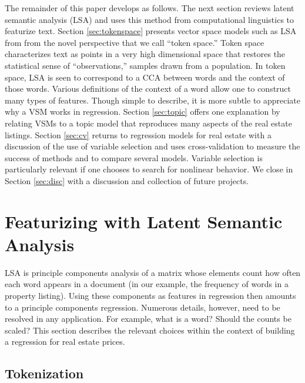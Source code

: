 \documentclass[12pt]{article}
\begin{document}
 The remainder of this paper develops as follows.  The next section reviews
 latent semantic analysis (LSA) and uses this method from computational
 linguistics to featurize text.  Section \ref{sec:tokenspace} presents vector
 space models such as LSA from from the novel perspective that we call ``token
 space.'' Token space characterizes text as points in a very high dimensional
 space that restores the statistical sense of ``observations,'' samples drawn
 from a population.  In token space, LSA is seen to correspond to a CCA between
 words and the context of those words.  Various definitions of the context of a
 word allow one to construct many types of features.  Though simple to describe,
 it is more subtle to appreciate why a VSM works in regression.  Section
 \ref{sec:topic} offers one explanation by relating VSMs to a topic model that
 reproduces many aspects of the real estate listings.  Section \ref{sec:cv}
 returns to regression models for real estate with a discussion of the use of
 variable selection and uses cross-validation to measure the success of methods
 and to compare several models.  Variable selection is particularly relevant if
 one chooses to search for nonlinear behavior.  We close in Section
 \ref{sec:disc} with a discussion and collection of future projects.



\section{Featurizing with Latent Semantic Analysis}
\label{sec:lsa}

 LSA is principle components analysis of a matrix whose elements count how often
 each word appears in a document (in our example, the frequency of words in a
 property listing).  Using these components as features in regression then
 amounts to a principle components regression.  Numerous details, however, need
 to be resolved in any application.  For example, what is a word?  Should the
 counts be scaled?  This section describes the relevant choices within the
 context of building a regression for real estate prices.
 
 \subsection{ Tokenization }  %
\end{document}
